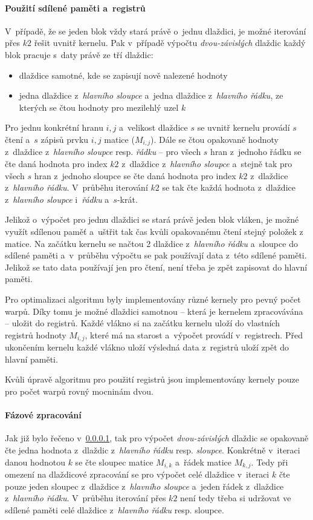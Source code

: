 \paragraph{Použití sdílené paměti a~registrů}\label{cuda:sdilena}
V~případě, že se jeden blok vždy stará právě o~jednu dlaždici, je možné iterování přes $k2$ řešit uvnitř kernelu. 
Pak v~případě výpočtu \emph{dvou-závislých} dlaždic každý blok pracuje s~daty právě ze tří dlaždic:
\begin{itemize}
    \item dlaždice samotné, kde se zapisují nově nalezené hodnoty
    \item jedna dlaždice z~\emph{hlavního sloupce} a~jedna dlaždice z~\emph{hlavního řádku}, ze kterých se čtou hodnoty
        pro mezilehlý uzel $k$
\end{itemize}

Pro jednu konkrétní hranu $i,j$ a~velikost dlaždice $s$ se uvnitř kernelu provádí $s$ čtení a~$s$ zápisů prvku $i,j$ matice ($M_{i,j}$).
Dále se čtou opakovaně hodnoty z~dlaždice z~\emph{hlavního sloupce} resp. \emph{řádku} -- pro všech $s$ hran z~jednoho řádku se čte
daná hodnota pro index $k2$ z~dlaždice z~\emph{hlavního sloupce} a~stejně tak pro všech $s$ hran z~jednoho sloupce se čte daná hodnota
pro index $k2$ z~dlaždice z~\emph{hlavního řádku}. V~průběhu iterování $k2$ se tak čte každá hodnota z~dlaždice z~\emph{hlavního sloupce} 
i~\emph{řádku} a~$s$-krát.

Jelikož o~výpočet pro jednu dlaždici se stará právě jeden blok vláken, je možné využít sdílenou paměť a~uštřit tak čas kvůli opakovanému 
čtení stejný položek z matice. Na začátku kernelu se načtou 2 dlaždice z~\emph{hlavního řádku} a~sloupce do sdílené paměti a~v~průběhu 
výpočtu se pak používají data z~této sdílené paměti. Jelikož se tato data používají jen pro čtení, není třeba je zpět zapisovat do 
hlavní paměti.

Pro optimalizaci algoritmu byly implementovány různé kernely pro pevný počet warpů. Díky tomu je možné dlaždici samotnou -- která je 
kernelem zpracovávána -- uložit do registrů. Každé vlákno si na začátku kernelu uloží do vlastních registrů hodnoty $M_{i,j}$, které
má na starost a~výpočet provádí v~registrech. Před ukončením kernelu každé vlákno uloží výsledná data z~registrů uloží zpět do hlavní 
paměti.

Kvůli úpravě algoritmu pro použití registrů jsou implementovány kernely pouze pro počet warpů rovný mocninám dvou.

\paragraph{Fázové zpracování}
Jak již bylo řečeno v~\ref{cuda:sdilena}, tak pro výpočet \emph{dvou-závislých} dlaždic se opakovaně čte jedna hodnota z~dlaždic 
z~\emph{hlavního řádku} resp. \emph{sloupce}. Konkrétně v~iteraci danou hodnotou $k$ se čte sloupec matice $M_{i,k}$ a~řádek matice
$M_{k,j}$. Tedy při omezení na dlaždicové zpracování se pro výpočet celé dlaždice v~iteraci $k$ čte pouze jeden sloupec z~dlaždice
z~\emph{hlavního sloupce} a~jeden řádek z~dlaždice z~\emph{hlavního řádku}. V~průběhu iterování přes $k2$ není tedy třeba si udržovat 
ve sdílené paměti celé dlaždice z~\emph{hlavního řádku} resp. sloupce.

